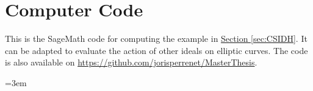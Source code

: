 \documentclass[openany, a4paper, 10pt]{book}
\theoremstyle{plain}
\theoremstyle{plain}
\theoremstyle{plain}
\theoremstyle{definition}
\theoremstyle{plain}
\theoremstyle{definition}
\theoremstyle{remark}
\newcommand{\secref}[1]{\hyperref[#1]{Section \ref{#1}}}
\begin{document}
\appendix
\chapter{Computer Code}\label{code}
This is the SageMath code \cite{sagemath} for computing the example in \secref{sec:CSIDH}.
It can be adapted to evaluate the action of other ideals on elliptic curves.
The code is also available on \url{https://github.com/jorisperrenet/MasterThesis}.


{
    \emergencystretch=3em
    \printbibliography[heading=bibintoc]
}
\end{document}
